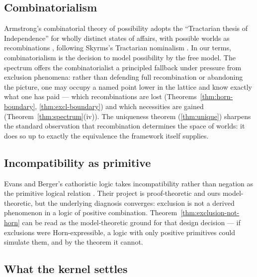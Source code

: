 \documentclass[10pt, letterpaper]{article}
\theoremstyle{remark}
\begin{document}
\subsection{Combinatorialism}

Armstrong's combinatorial theory of possibility adopts the ``Tractarian
thesis of Independence'' for wholly distinct states of affairs, with
possible worlds as recombinations \cite{armstrong1989}, following Skyrms's
Tractarian nominalism \cite{skyrms1981}. In our terms, combinatorialism is
the decision to model possibility by the free model. The spectrum offers the
combinatorialist a principled fallback under pressure from exclusion
phenomena: rather than defending full recombination or abandoning the
picture, one may occupy a named point lower in the lattice and know exactly
what one has paid --- which recombinations are lost
(Theorems~\ref{thm:horn-boundary}, \ref{thm:excl-boundary}) and which
necessities are gained (Theorem~\ref{thm:spectrum}(iv)). The uniqueness
theorem (\ref{thm:unique}) sharpens the standard observation that
recombination determines the space of worlds: it does so up to exactly the
equivalence the framework itself supplies.

\subsection{Incompatibility as primitive}

Evans and Berger's cathoristic logic takes incompatibility rather than
negation as the primitive logical relation \cite{evans2014}. Their project is
proof-theoretic and ours model-theoretic, but the underlying diagnosis
converges: exclusion is not a derived phenomenon in a logic of positive
combination. Theorem~\ref{thm:exclusion-not-horn} can be read as the
model-theoretic ground for that design decision --- if exclusions were
Horn-expressible, a logic with only positive primitives could simulate them,
and by the theorem it cannot.

\subsection{What the kernel settles}
\end{document}
